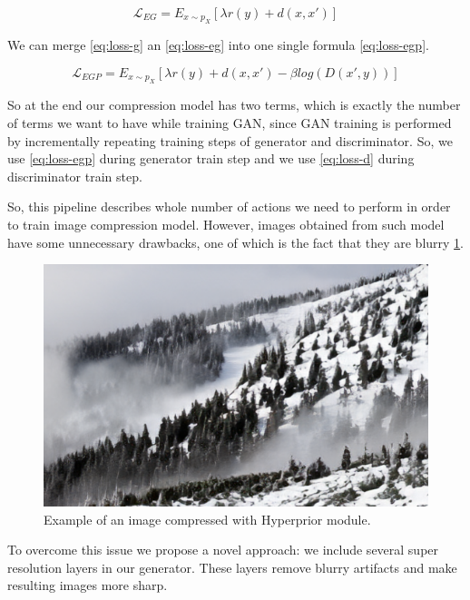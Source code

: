 \begin{equation}
    \label{eq:loss-eg}
    \mathcal{L}_{EG}=E_{x\sim p_X}[\lambda r(y)+d(x, x')]
\end{equation}

We can merge \ref{eq:loss-g} an \ref{eq:loss-eg} into one single formula \ref{eq:loss-egp}.

\begin{equation}
    \label{eq:loss-egp}
    \mathcal{L}_{EGP}=E_{x\sim p_X}[\lambda r(y)+d(x, x')-\beta log(D(x',y))]
\end{equation}

So at the end our compression model has two terms, which is exactly the number of terms we want to have while training GAN, since GAN training is performed by incrementally repeating training steps of generator and discriminator. So, we use \ref{eq:loss-egp} during generator train step and we use \ref{eq:loss-d} during discriminator train step.

So, this pipeline describes whole number of actions we need to perform in order to train image compression model. However, images obtained from such model have some unnecessary drawbacks, one of which is the fact that they are blurry \ref{forest-blurry}.

\begin{figure}[!ht]
    \centering
    \includegraphics[width=\textwidth]{figure/forest-blurry.png}
    \caption{Example of an image compressed with Hyperprior module.}
    \label{forest-blurry}
\end{figure}

To overcome this issue we propose a novel approach: we include several super resolution layers in our generator. These layers remove blurry artifacts and make resulting images more sharp.

